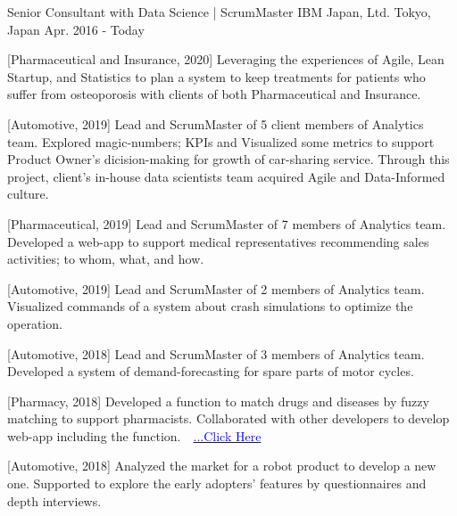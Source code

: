 

\begin{cventries}

  \cventry
    {Senior Consultant with Data Science | ScrumMaster} %
    {IBM Japan, Ltd.} %
    {Tokyo, Japan} %
    {Apr. 2016 - Today} %
    {
      \begin{cvenumerate} %
        \item {[Pharmaceutical and Insurance, 2020] Leveraging the experiences of Agile, Lean Startup, and Statistics to plan a system to keep treatments for patients who suffer from osteoporosis with clients of both Pharmaceutical and Insurance.}
        \item {[Automotive, 2019] Lead and ScrumMaster of 5 client members of Analytics team. Explored magic-numbers; KPIs and Visualized some metrics to support Product Owner's dicision-making for growth of car-sharing service. Through this project, client's in-house data scientists team acquired Agile and Data-Informed culture.}
        \item {[Pharmaceutical, 2019] Lead and ScrumMaster of 7 members of Analytics team. Developed a web-app to support medical representatives recommending sales activities; to whom, what, and how.}
        \item {[Automotive, 2019] Lead and ScrumMaster of 2 members of Analytics team. Visualized commands of a system about crash simulations to optimize the operation.}
        \item {[Automotive, 2018] Lead and ScrumMaster of 3 members of Analytics team. Developed a system of demand-forecasting for spare parts of motor cycles.}
        \item {[Pharmacy, 2018] Developed a function to match drugs and diseases by fuzzy matching to support pharmacists. Collaborated with other developers to develop web-app including the function.　\href{https://www.ibm.com/think/jp-ja/business/sakura-ai/}{\textcolor{blue}{...Click Here}}}
        \item {[Automotive, 2018] Analyzed the market for a robot product to develop a new one. Supported to explore the early adopters' features by questionnaires and depth interviews.}

\end{cvenumerate}}
\end{cventries}
